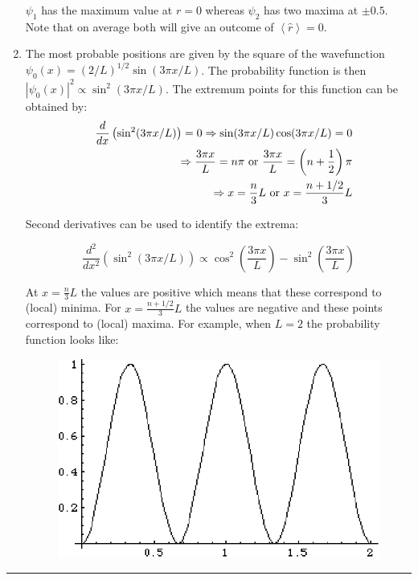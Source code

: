 \begin{enumerate}
$\psi_1$ has the maximum value at $r = 0$ whereas $\psi_2$ has two maxima at $\pm 0.5$. Note that on average both will give an outcome of $\left<\hat{r}\right> = 0$.

\item The most probable positions are given by the square of the wavefunction $\psi_0(x) = \left(2/L\right)^{1/2}\sin(3\pi x/L)$. The probability function is then $\left|\psi_0(x)\right|^2 \propto \sin^2(3\pi x/L)$. The extremum points for this function can be obtained by:
\begin{eqnarray}
\nonumber
& & \frac{d}{dx}\left(\sin^2(3\pi x/L)\right) = 0 \Rightarrow \sin(3\pi x/L)\cos(3\pi x/L) = 0\\
\nonumber
& & \Rightarrow \frac{3\pi x}{L} = n\pi\textnormal{ or }\frac{3\pi x}{L} = \left(n + \frac{1}{2}\right)\pi\\
\nonumber
& & \Rightarrow x = \frac{n}{3}L\textnormal{ or }x = \frac{n + 1/2}{3}L
\end{eqnarray}

Second derivatives can be used to identify the extrema:

$$\frac{d^2}{dx^2}\left(\sin^2(3\pi x/L)\right) \propto \cos^2\left(\frac{3\pi x}{L}\right) - \sin^2\left(\frac{3\pi x}{L}\right)$$

At $x = \frac{n}{3}L$ the values are positive which means that these correspond to (local) minima. For $x = \frac{n+1/2}{3}L$ the values are negative
and these points correspond to (local) maxima. For example, when $L = 2$ the probability function looks like:

\begin{figure}[htp!]
\centering\includegraphics[scale=0.7]{wavefun3}
\end{figure}

\end{enumerate}

\hrule\vspace{0.5cm}
